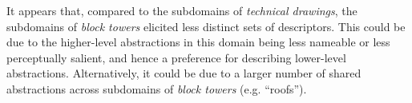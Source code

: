 






It appears that, compared to the subdomains of \textit{technical drawings}, the subdomains of \textit{block towers} elicited less distinct sets of descriptors.
This could be due to the higher-level abstractions in this domain being less nameable or less perceptually salient, and hence a preference for describing lower-level abstractions.
Alternatively, it could be due to a larger number of shared abstractions across subdomains of \textit{block towers} (e.g. ``roofs'').




